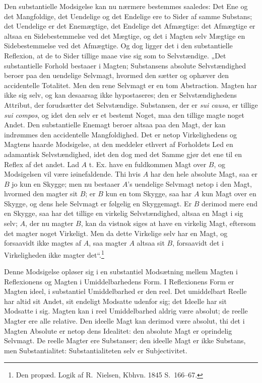 \documentclass[11pt]{book}
\newcommand{\opage}[1]{\marginnote{\footnotesize\textit{[#1]}}}
\begin{document}
Den substantielle Modsigelse kan nu nærmere bestemmes saaledes: Det Ene
og det Mangfoldige, det Uendelige og det Endelige ere to Sider af samme
Substans; det Uendelige er det Enemægtige, det Endelige det Afmægtige:
det Afmægtige er altsaa en Sidebestemmelse ved det Mægtige, og det i
Magten selv Mægtige en Sidebestemmelse ved det Afmægtige. Og dog ligger
det i den substantielle Reflexion, at de to Sider tillige maae vise sig
som to Selvstændige. „Det substantielle Forhold bestaaer i Magten;
Substansens absolute Selvstændighed beroer paa den uendelige Selvmagt,
hvormed den sætter og ophæver den accidentelle Totalitet. Men den rene
Selvmagt er en tom Abstraction. Magten har ikke sig selv, og kan
desaarsag ikke hypostaseres; den er Selvstændighedens Attribut, der
forudsætter det Selvstændige. Substansen, der er \textit{sui causa}, er
tillige \textit{sui compos}, og idet den selv er et bestemt Noget, maa
den tillige magte noget Andet. Den substantielle Enemagt beroer altsaa
paa den Magt, der kan indrømmes den accidentelle Mangfoldighed. Det er
netop Virkelighedens og Magtens haarde Modsigelse, at den meddeler
ethvert af Forholdets Led en adamantisk Selvstændighed, idet den dog med
det Samme gjør det ene til en Reflex af det andet. Lad $A$ t. Ex. have en
fuldkommen Magt over $B$, og Modsigelsen vil være iøinefaldende. Thi hvis
$A$ har den hele absolute Magt, saa er $B$ jo kun en Skygge; men nu
bestaaer $A$'s uendelige Selvmagt netop i den Magt, hvormed den magter
sit $B$; er $B$ kun en tom Skygge, saa har $A$ kun Magt over en Skygge,
og dens hele Selvmagt er følgelig en Skyggemagt. Er $B$ derimod mere end
en Skygge, saa har
\opage{113} \setcounter{footnote}{0}%
det tillige en virkelig Selvstændighed, altsaa en Magt i sig selv; $A$,
der nu magter $B$, kan da vistnok siges at have en virkelig Magt,
eftersom det magter noget Virkeligt. Men da dette Virkelige selv har en
Magt, og forsaavidt ikke magtes af $A$, saa magter $A$ altsaa sit $B$,
forsaavidt det i Virkeligheden ikke magter det“.\footnote{Den propæd.
Logik af R.\ Nielsen, Kbhvn. 1845 S.\ 166--67.}

Denne Modsigelse opløser sig i en substantiel Modsætning mellem Magten i
Reflexionens og Magten i Umiddelbarhedens Form. I Reflexionens Form er
Magten ideel, i substantiel Umiddelbarhed er den reel. Det umiddelbart
Reelle har altid sit Andet, sit endeligt Modsatte udenfor sig; det
Ideelle har sit Modsatte i sig. Magten kan i reel Umiddelbarhed aldrig
være absolut; de reelle Magter ere alle relative. Den ideelle Magt kan
derimod være absolut, thi det i Magten Absolute er netop dens Idealitet:
den absolute Magt er oprindelig Selvmagt. De reelle Magter ere
Substanser; den ideelle Magt er ikke Substans, men Substantialitet:
Substantialiteten selv er Subjectivitet.
\end{document}
